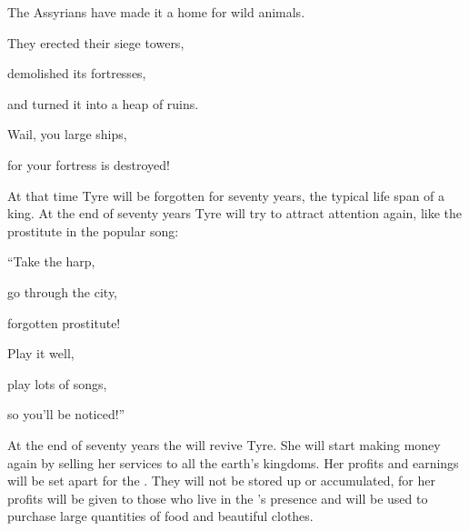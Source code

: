 {\par }{\Q The Assyrians
have made it a home for wild animals.
\par }{\Q They erected
their siege towers,
\par }{\Q demolished
its fortresses,
\par }{\Q and turned
it into a heap of ruins.
\par }{\Q {}Wail,
you large ships,
\par }{\Q for
your fortress
is destroyed!
\par }{\PP {}At that time
Tyre
will be
forgotten
for seventy
years,
the typical
life span of a king.
At the end
of seventy
years
Tyre
will try to attract attention again, like the prostitute
in the popular song:
\par }{\Q {}“Take
the harp,
\par }{\Q go
through the city,
\par }{\Q forgotten
prostitute!
\par }{\Q Play it well,
\par }{\Q play
lots of songs,
\par }{\Q so you’ll
be noticed!”
\par }{\PP {}At the end
of seventy
years
the {}
will revive
Tyre.
She will start making money again
by selling
her services
to all
the earth’s
kingdoms.
Her profits
and earnings
will be
set apart
for the
{}. They will not
be stored up
or
accumulated,
for
her profits
will be given to those who live
in the
{}’s
presence
and will be
used to purchase large quantities
of food
and beautiful
clothes.

}
